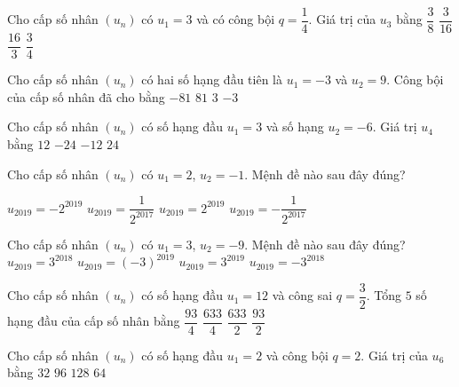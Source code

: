\begin{ex}%
	Cho cấp số nhân $(u_n)$ có $u_1=3$ và có công bội $q=\dfrac{1}{4}$. Giá trị của $u_3$ bằng
	\choice
	{$\dfrac{3}{8}$}
	{\True $\dfrac{3}{16}$}
	{$\dfrac{16}{3}$}
	{$\dfrac{3}{4}$}
\end{ex}%
\begin{ex}%
	Cho cấp số nhân $\left(u_n\right)$ có hai số hạng đầu tiên là $u_1=-3$ và $u_2=9$. Công bội của cấp số nhân đã cho bằng
	\choice
	{$ -81 $}
	{$ 81 $}
	{$ 3 $}
	{\True $ -3 $}
\end{ex}%
\begin{ex}%
Cho cấp số nhân $(u_n)$ có số hạng đầu $u_1=3$ và số hạng $u_2=-6$. Giá trị $u_4$ bằng
	\choice
	{$12$}
	{\True $-24$}
	{ $-12$}
	{$24$}
\end{ex}%
\begin{ex}%
	Cho cấp số nhân $(u_n)$ có $u_1=2$, $u_2=-1$. Mệnh đề nào sau đây đúng?
	
	\choice
	{$u_{2019}=-2^{2019}$}
	{\True $u_{2019}=\dfrac{1} {2^{2017}}$}
	{$u_{2019}=2^{2019}$}
	{$u_{2019}=-\dfrac{1} {2^{2017}}$}
\end{ex}%
\begin{ex}%
	Cho cấp số nhân $(u_n)$ có $u_1=3$, $u_2=-9$. Mệnh đề nào sau đây đúng?
	\choice
	{$u_{2019}=3^{2018}$}
	{ $u_{2019}=(-3)^{2019}$}
	{\True $u_{2019}=3^{2019}$}
	{$ u_{2019}=-3^{2018}$}
\end{ex}%
\begin{ex}%
	Cho cấp số nhân $(u_n)$ có số hạng đầu $u_1=12$ và công sai $q=\dfrac{3}{2}$. Tổng $5$ số hạng đầu của cấp số nhân bằng
	\choice
	{$\dfrac{93}{4}$}
	{\True $\dfrac{633}{4}$}
	{$\dfrac{633}{2}$}
	{$\dfrac{93}{2}$}
\end{ex}%
\begin{ex}%
	Cho cấp số nhân $(u_n)$ có số hạng đầu $u_1=2$ và công bội $q=2$. Giá trị của $u_6$ bằng
	\choice
	{$32$}
	{$96$}
	{$128$}
	{\True $64$}
\end{ex}